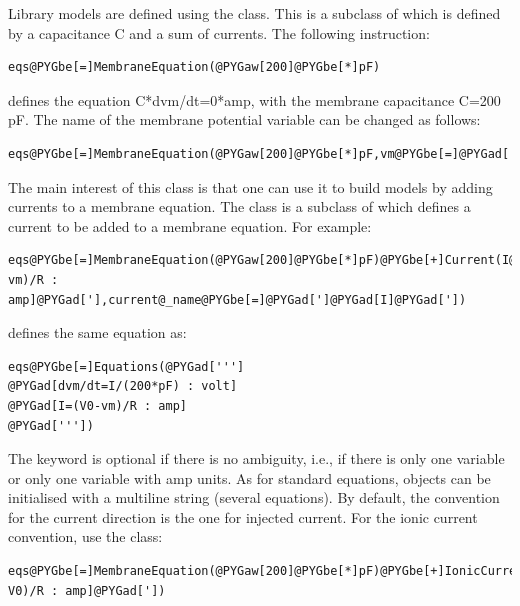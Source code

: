 \documentclass[letterpaper,10pt,english]{manual}
\begin{document}
Library models are defined using the  class. This is a subclass of
\hyperlink{brian.Equations}{} which is defined by a capacitance C and a sum of currents. The following instruction:

\begin{Verbatim}[commandchars=@\[\]]
eqs@PYGbe[=]MembraneEquation(@PYGaw[200]@PYGbe[*]pF)
\end{Verbatim}

defines the equation C*dvm/dt=0*amp, with the membrane capacitance C=200 pF. The name of the membrane potential
variable can be changed as follows:

\begin{Verbatim}[commandchars=@\[\]]
eqs@PYGbe[=]MembraneEquation(@PYGaw[200]@PYGbe[*]pF,vm@PYGbe[=]@PYGad[']@PYGad[V]@PYGad['])
\end{Verbatim}

The main interest of this class is that one can use it to build models by adding currents to a membrane
equation. The  class is a subclass of \hyperlink{brian.Equations}{} which defines a current to be added
to a membrane equation. For example:

\begin{Verbatim}[commandchars=@\[\]]
eqs@PYGbe[=]MembraneEquation(@PYGaw[200]@PYGbe[*]pF)@PYGbe[+]Current(I@PYGbe[=]@PYGad[']@PYGad[(V0-vm)/R : amp]@PYGad['],current@_name@PYGbe[=]@PYGad[']@PYGad[I]@PYGad['])
\end{Verbatim}

defines the same equation as:

\begin{Verbatim}[commandchars=@\[\]]
eqs@PYGbe[=]Equations(@PYGad[''']
@PYGad[dvm/dt=I/(200*pF) : volt]
@PYGad[I=(V0-vm)/R : amp]
@PYGad['''])
\end{Verbatim}

The keyword  is optional if there is no ambiguity, i.e., if there is only one variable
or only one variable with amp units. As for standard equations,  objects can be initialised with
a multiline string (several equations). By default, the convention for the current direction is the one for injected
current. For the ionic current convention, use the  class:

\begin{Verbatim}[commandchars=@\[\]]
eqs@PYGbe[=]MembraneEquation(@PYGaw[200]@PYGbe[*]pF)@PYGbe[+]IonicCurrent(I@PYGbe[=]@PYGad[']@PYGad[(vm-V0)/R : amp]@PYGad['])
\end{Verbatim}
\end{document}
